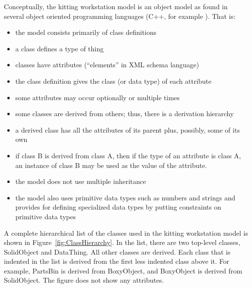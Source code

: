 Conceptually, the kitting workstation model is an object model as found in
several object oriented programming languages (C++, for example
\cite{Stroustrup.2000}).  That is:
\begin{itemize}
\item the model consists primarily of class definitions
\item a class defines a type of thing
\item classes have attributes (``elements'' in XML schema language)
\item the class definition gives the class (or data type) of each attribute
\item some attributes may occur optionally or multiple times
\item some classes are derived from others; thus, there is a derivation
 hierarchy 
\item a derived class has all the attributes of its parent plus, possibly,
  some of its own
\item if class B is derived from class A, then if the type of an attribute
  is class A, an instance of class B may be used as the value of the attribute.
\item the model does not use multiple inheritance
\item the model also uses primitive data types such as numbers and strings
  and provides for defining specialized data types by putting constraints
  on primitive data types
\end{itemize}

A complete hierarchical list of the classes used in the kitting workstation
model is shown in Figure~\ref{fig:ClassHierarchy}. In the list, there are two
top-level classes, SolidObject and DataThing. All other classes are
derived. Each class that is indented in the list is derived from the first
less indented class above it. For example, PartsBin is derived from
BoxyObject, and BoxyObject is derived from SolidObject. The figure does not
show any attributes.

